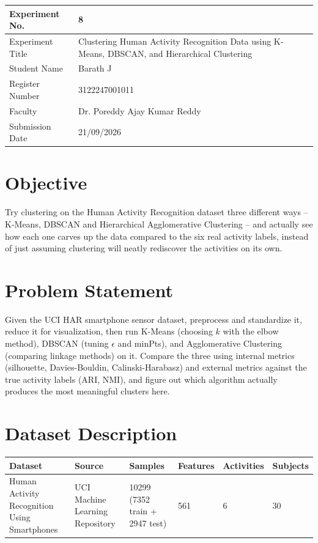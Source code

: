 \documentclass[12pt,a4paper]{article}
\begin{document}
\begin{tabular}{|p{4cm}|p{11cm}|}
\hline
Experiment No. & 8 \\ \hline
Experiment Title & Clustering Human Activity Recognition Data using K-Means, DBSCAN, and Hierarchical
Clustering\footnotemark \\ \hline
Student Name & Barath J \\ \hline
Register Number & 3122247001011 \\ \hline
Faculty & Dr. Poreddy Ajay Kumar Reddy \\ \hline
Submission Date & 21/09/2026 \\ \hline
\end{tabular}

\section{Objective}
Try clustering on the Human Activity Recognition dataset three different ways -- K-Means, DBSCAN and
Hierarchical Agglomerative Clustering -- and actually see how each one carves up the data compared to
the six real activity labels, instead of just assuming clustering will neatly rediscover the activities
on its own.

\section{Problem Statement}
Given the UCI HAR smartphone sensor dataset, preprocess and standardize it, reduce it for
visualization, then run K-Means (choosing $k$ with the elbow method), DBSCAN (tuning $\epsilon$ and
minPts), and Agglomerative Clustering (comparing linkage methods) on it. Compare the three using
internal metrics (silhouette, Davies-Bouldin, Calinski-Harabasz) and external metrics against the true
activity labels (ARI, NMI), and figure out which algorithm actually produces the most meaningful
clusters here.

\section{Dataset Description}
\begin{longtable}{|p{3.5cm}|p{4cm}|p{1.6cm}|p{1.8cm}|p{2cm}|p{2.2cm}|}
\hline
\textbf{Dataset} & \textbf{Source} & \textbf{Samples} & \textbf{Features} & \textbf{Activities} & \textbf{Subjects} \\ \hline
Human Activity Recognition Using Smartphones & UCI Machine Learning Repository & 10299 (7352 train +
2947 test) & 561 & 6 & 30 \\ \hline
\end{longtable}
\end{document}
